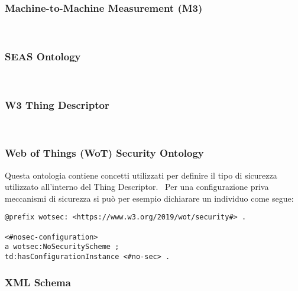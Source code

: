 \subsubsection{Machine-to-Machine Measurement (M3)}
~\cite{SWoTSema18:online}
\subsubsection{SEAS Ontology}
~\cite{SEAS:online}
\subsubsection{W3 Thing Descriptor}
~\cite{ThingDes54:online}
\subsubsection{Web of Things (WoT) Security Ontology}
Questa ontologia contiene concetti utilizzati per definire il tipo di sicurezza utilizzato all'interno del Thing Descriptor.~\cite{WebofThi54:online}
Per una configurazione priva meccanismi di sicurezza si può per esempio dichiarare un individuo come segue:
\begin{verbatim}
@prefix wotsec: <https://www.w3.org/2019/wot/security#> .

<#nosec-configuration>
a wotsec:NoSecurityScheme ;
td:hasConfigurationInstance <#no-sec> .
\end{verbatim}

\subsubsection{XML Schema}
~\cite{XMLSchem83:online}
